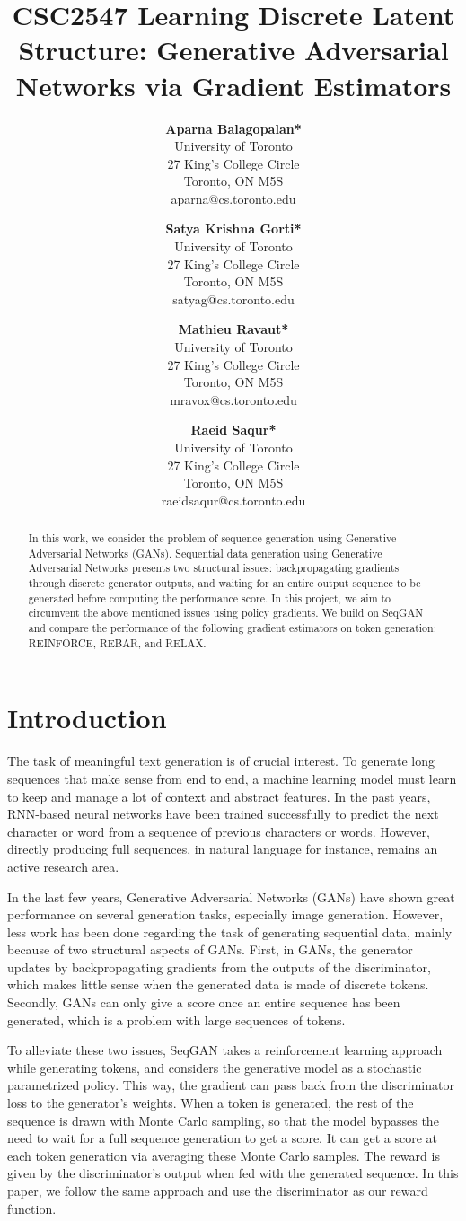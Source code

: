 \documentclass[11pt, english]{article}
\title{CSC2547 Learning Discrete Latent Structure: Generative Adversarial Networks via Gradient Estimators}
\author{
  	\textbf{Aparna Balagopalan*}\\
	University of Toronto\\
	27 King's College Circle\\
	Toronto, ON M5S\\
	aparna@cs.toronto.edu
	\and
  	\textbf{Satya Krishna Gorti*}\\
	University of Toronto\\
	27 King's College Circle\\
	Toronto, ON M5S\\
	satyag@cs.toronto.edu
	\and
	\textbf{Mathieu Ravaut*} \\ 
	University of Toronto \\
	27 King's College Circle\\
	Toronto, ON M5S\\
	mravox@cs.toronto.edu 
	\and
  	\textbf{Raeid Saqur*}\\
	University of Toronto\\
	27 King's College Circle\\
	Toronto, ON M5S\\
	raeidsaqur@cs.toronto.edu	
}
\begin{document}
  
  
  \maketitle
  
  \begin{abstract}
  In this work, we consider the problem of sequence generation using Generative Adversarial Networks (GANs). Sequential data generation using Generative Adversarial Networks presents two structural issues: backpropagating gradients through discrete generator outputs, and waiting for an entire output sequence to be generated before computing the performance score. In this project, we aim to circumvent the above mentioned issues using policy gradients. We build on SeqGAN and compare the performance of the following gradient estimators on token generation: REINFORCE, REBAR, and RELAX. 

  \end{abstract}
  
  \thispagestyle{equalc}
  \section{Introduction}
  The task of meaningful text generation is of crucial interest. To generate long sequences that make sense from end to end, a machine learning model must learn to keep and manage a lot of context and abstract features. In the past years, RNN-based neural networks have been trained successfully to predict the next character or word from a sequence of previous characters or words. However, directly producing full sequences, in natural language for instance, remains an active research area. 
  
In the last few years, Generative Adversarial Networks (GANs) have shown great performance on several generation tasks, especially image generation.  However, less work has been done regarding the task of generating sequential data, mainly because of two structural aspects of GANs. First, in GANs, the generator updates by backpropagating gradients from the outputs of the discriminator, which makes
little sense when the generated data is made of discrete tokens. Secondly, GANs can only give a score once an entire sequence has been generated, which is a problem with large sequences of tokens.

To alleviate these two issues, SeqGAN takes a reinforcement learning approach while generating tokens, and considers the generative model as a stochastic parametrized policy. This way, the gradient can pass back from the discriminator loss to the generator’s weights. When a token is generated, the
rest of the sequence is drawn with Monte Carlo sampling, so that the model bypasses the need to wait for a full sequence generation to get a score. It can get a score at each token generation via averaging these Monte Carlo samples. The reward is given by the discriminator's output when fed with the generated sequence. In this paper, we follow the same approach and use the discriminator as our reward function. 
  
\end{document}
